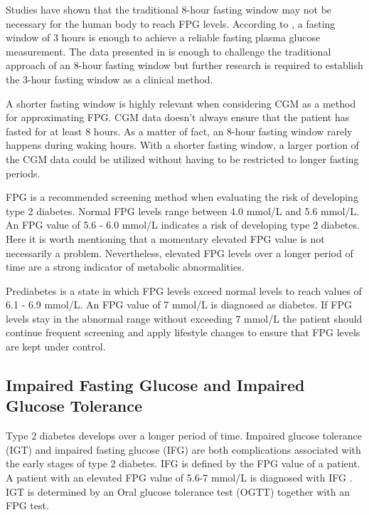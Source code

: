 \documentclass[english, 12pt, a4paper, elec, utf8, a-1b, online]{aaltothesis}
\begin{document}
Studies have shown that the traditional 8-hour fasting window may not be necessary for the human body
to reach FPG levels\cite{moebus_impact_2011}. According to \cite{moebus_impact_2011}, a
fasting window of 3 hours is enough to achieve a reliable fasting plasma glucose measurement. The data presented
in \cite{moebus_impact_2011} is enough to challenge the traditional approach of an 8-hour fasting window but further 
research is required to establish the 3-hour fasting window as a clinical method. 
 
A shorter fasting window is highly relevant when considering CGM as a method for approximating FPG. CGM data 
doesn't always ensure that the patient has fasted for at least 8 hours. As a matter of fact, an 8-hour fasting window 
rarely happens during waking hours. With a shorter fasting window, a larger portion of the CGM data could be utilized
without having to be restricted to longer fasting periods. 

FPG is a recommended screening method when evaluating the risk of developing type 2 diabetes\cite{ekoe_screening_2018}.
Normal FPG levels range between 4.0 mmol/L and 5.6 mmol/L. An FPG value of 5.6 - 6.0 mmol/L 
indicates a risk of developing type 2 diabetes\cite{mathew_blood_2022}. Here it is worth mentioning that a 
momentary elevated FPG value is not necessarily a problem. Nevertheless, elevated FPG levels 
over a longer period of time are a strong indicator of metabolic abnormalities. 

Prediabetes is a state in which FPG levels exceed normal levels to reach values of 6.1 - 6.9 mmol/L. 
An FPG value of 7 mmol/L is diagnosed as diabetes\cite{diabetes_tests}.
If FPG levels stay in the abnormal range without exceeding 7 mmol/L the patient should continue frequent 
screening and apply lifestyle changes to ensure that FPG levels are kept under control\cite{ekoe_screening_2018}.

\subsection{Impaired Fasting Glucose and Impaired Glucose Tolerance}
Type 2 diabetes develops over a longer period of time. Impaired glucose tolerance (IGT) and impaired fasting
glucose (IFG) are both complications associated with the early stages of type 2 diabetes\cite{walker_diet_2010}.
IFG is defined by the FPG value of a patient. A patient with an elevated FPG value of 5.6-7 mmol/L is diagnosed 
with IFG \cite{nathan_impaired_2007}. IGT is determined by an Oral glucose tolerance 
test (OGTT) together with an FPG test. 
\end{document}
